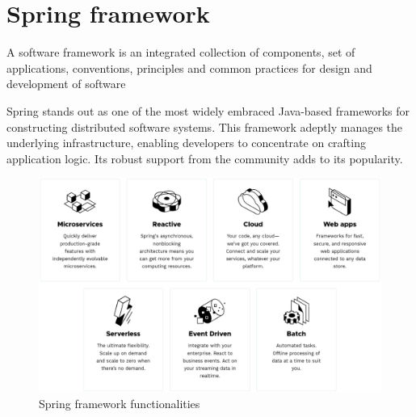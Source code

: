 \section{Spring framework}

\begin{definition}
    A software framework is an integrated collection of components, set of applications, conventions, principles and common practices for design and development of software
\end{definition}
Spring stands out as one of the most widely embraced Java-based frameworks for constructing distributed software systems. 
This framework adeptly manages the underlying infrastructure, enabling developers to concentrate on crafting application logic. 
Its robust support from the community adds to its popularity.
\begin{figure}[H]
    \centering
    \includegraphics[width=0.75\linewidth]{images/spring.png}
    \caption{Spring framework functionalities}
\end{figure}